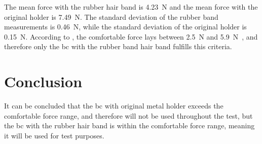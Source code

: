 The mean force with the rubber hair band is \SI{4.23}{\newton} and the mean force with the original holder is \SI{7.49}{\newton}. The standard deviation of the rubber band measurements is \SI{0.46}{\newton}, while the standard deviation of the original holder is \SI{0.15}{\newton}. According to \citep{ANSI_S35}, the comfortable force lays between \SI{2.5}{\newton} and \SI{5.9}{\newton,} and therefore only the \gls{bc} with the rubber band hair band fulfills this criteria. 

\section*{Conclusion}

It can be concluded that the \gls{bc} with original metal holder exceeds the comfortable force range, and therefore will not be used throughout the test, but the \gls{bc} with the rubber hair band is within the comfortable force range, meaning it will be used for test purposes.


